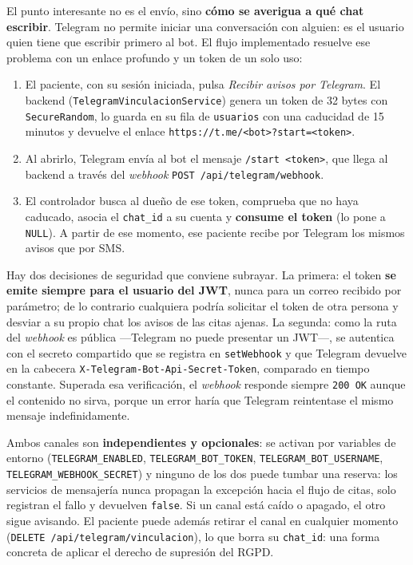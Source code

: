 \documentclass[12pt,a4paper]{report}
\begin{document}
El punto interesante no es el envío, sino \textbf{cómo se averigua a qué chat escribir}. Telegram no permite iniciar una conversación con alguien: es el usuario quien tiene que escribir primero al bot. El flujo implementado resuelve ese problema con un enlace profundo y un token de un solo uso:
\begin{enumerate}
  \item El paciente, con su sesión iniciada, pulsa \emph{Recibir avisos por Telegram}. El backend (\texttt{TelegramVinculacionService}) genera un token de 32 bytes con \texttt{SecureRandom}, lo guarda en su fila de \texttt{usuarios} con una caducidad de 15 minutos y devuelve el enlace \texttt{https://t.me/<bot>?start=<token>}.
  \item Al abrirlo, Telegram envía al bot el mensaje \texttt{/start <token>}, que llega al backend a través del \emph{webhook} \texttt{POST /api/telegram/webhook}.
  \item El controlador busca al dueño de ese token, comprueba que no haya caducado, asocia el \texttt{chat\_id} a su cuenta y \textbf{consume el token} (lo pone a \texttt{NULL}). A partir de ese momento, ese paciente recibe por Telegram los mismos avisos que por SMS.
\end{enumerate}

Hay dos decisiones de seguridad que conviene subrayar. La primera: el token \textbf{se emite siempre para el usuario del JWT}, nunca para un correo recibido por parámetro; de lo contrario cualquiera podría solicitar el token de otra persona y desviar a su propio chat los avisos de las citas ajenas. La segunda: como la ruta del \emph{webhook} es pública —Telegram no puede presentar un JWT—, se autentica con el secreto compartido que se registra en \texttt{setWebhook} y que Telegram devuelve en la cabecera \texttt{X-Telegram-Bot-Api-Secret-Token}, comparado en tiempo constante. Superada esa verificación, el \emph{webhook} responde siempre \texttt{200 OK} aunque el contenido no sirva, porque un error haría que Telegram reintentase el mismo mensaje indefinidamente.

Ambos canales son \textbf{independientes y opcionales}: se activan por variables de entorno (\texttt{TELEGRAM\_ENABLED}, \texttt{TELEGRAM\_BOT\_TOKEN}, \texttt{TELEGRAM\_BOT\_USERNAME}, \texttt{TELEGRAM\_WEBHOOK\_SECRET}) y ninguno de los dos puede tumbar una reserva: los servicios de mensajería nunca propagan la excepción hacia el flujo de citas, solo registran el fallo y devuelven \texttt{false}. Si un canal está caído o apagado, el otro sigue avisando. El paciente puede además retirar el canal en cualquier momento (\texttt{DELETE /api/telegram/vinculacion}), lo que borra su \texttt{chat\_id}: una forma concreta de aplicar el derecho de supresión del RGPD.
\end{document}
